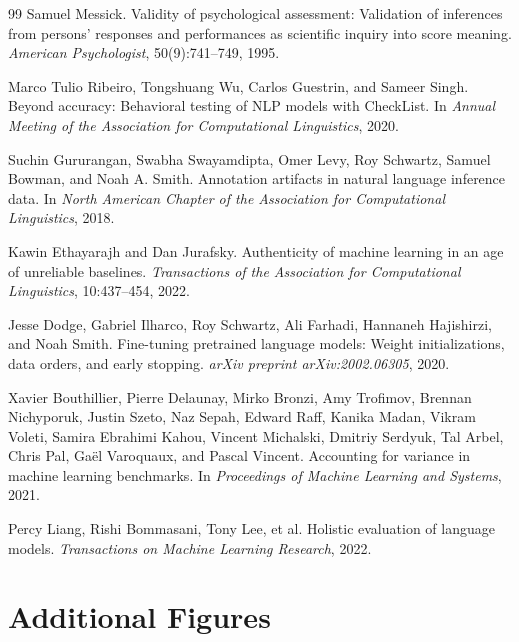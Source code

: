 \documentclass{article}
\begin{document}
\begin{thebibliography}{99}
Samuel Messick.
\newblock Validity of psychological assessment: Validation of inferences from persons' responses and performances as scientific inquiry into score meaning.
\newblock \emph{American Psychologist}, 50(9):741--749, 1995.

Marco Tulio Ribeiro, Tongshuang Wu, Carlos Guestrin, and Sameer Singh.
\newblock Beyond accuracy: Behavioral testing of NLP models with CheckList.
\newblock In \emph{Annual Meeting of the Association for Computational Linguistics}, 2020.

Suchin Gururangan, Swabha Swayamdipta, Omer Levy, Roy Schwartz, Samuel Bowman, and Noah A. Smith.
\newblock Annotation artifacts in natural language inference data.
\newblock In \emph{North American Chapter of the Association for Computational Linguistics}, 2018.

Kawin Ethayarajh and Dan Jurafsky.
\newblock Authenticity of machine learning in an age of unreliable baselines.
\newblock \emph{Transactions of the Association for Computational Linguistics}, 10:437--454, 2022.

Jesse Dodge, Gabriel Ilharco, Roy Schwartz, Ali Farhadi, Hannaneh Hajishirzi, and Noah Smith.
\newblock Fine-tuning pretrained language models: Weight initializations, data orders, and early stopping.
\newblock \emph{arXiv preprint arXiv:2002.06305}, 2020.

Xavier Bouthillier, Pierre Delaunay, Mirko Bronzi, Amy Trofimov, Brennan Nichyporuk, Justin Szeto, Naz Sepah, Edward Raff, Kanika Madan, Vikram Voleti, Samira Ebrahimi Kahou, Vincent Michalski, Dmitriy Serdyuk, Tal Arbel, Chris Pal, Gaël Varoquaux, and Pascal Vincent.
\newblock Accounting for variance in machine learning benchmarks.
\newblock In \emph{Proceedings of Machine Learning and Systems}, 2021.

Percy Liang, Rishi Bommasani, Tony Lee, et al.
\newblock Holistic evaluation of language models.
\newblock \emph{Transactions on Machine Learning Research}, 2022.

\end{thebibliography}

\appendix

\section{Additional Figures}
\end{document}

